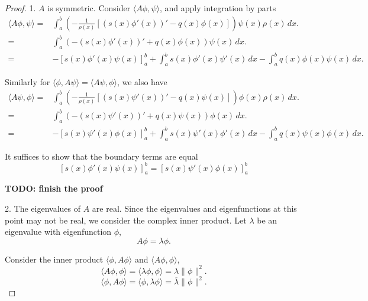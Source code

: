 \begin{proof}
    1. $A$ is symmetric. Consider $\langle A\phi, \psi \rangle$, and apply integration by parts
    \begin{equation}\label{eq.proof_SL_integral_parts}
    \begin{split}
        \langle A\phi, \psi \rangle =& \int_a^b \left(-\frac{1}{\rho(x)}[(s(x)\phi'(x))' - q(x)\phi(x)]\right) \psi(x) \rho(x) \, dx. 
        \\
        =& \int_a^b \left( -(s(x)\phi'(x))' + q(x)\phi(x) \right)\psi(x) \, dx. 
        \\
        =&-[s(x)\phi'(x)\psi(x)]_a^b + \int_a^b s(x)\phi'(x)\psi'(x) \, dx - \int_a^b q(x)\phi(x)\psi(x) \, dx.
    \end{split} 
    \end{equation}

    Similarly for $\langle \phi, A\psi\rangle = \langle A\psi, \phi\rangle$, we also have
    \begin{equation}\label{eq.proof_SL_integral_parts'}
    \begin{split}
        \langle A\psi, \phi\rangle =& \int_a^b \left(-\frac{1}{\rho(x)}[(s(x)\psi'(x))' - q(x)\psi(x)]\right) \phi(x) \rho(x) \, dx. 
        \\
        =& \int_a^b \left( -(s(x)\psi'(x))' + q(x)\psi(x) \right)\phi(x) \, dx. 
        \\
        =&-[s(x)\psi'(x)\phi(x)]_a^b + \int_a^b s(x)\psi'(x)\phi'(x) \, dx - \int_a^b q(x)\psi(x)\phi(x) \, dx.
    \end{split} 
    \end{equation}
    
    It suffices to show that the boundary terms are equal
    \begin{equation}\label{eq.proof_SL_boundary}
        [s(x)\phi'(x)\psi(x)]_a^b = [s(x)\psi'(x)\phi(x)]_a^b
    \end{equation}

    \textbf{TODO: finish the proof}
    
    2.  The eigenvalues of $A$ are real. Since the eigenvalues and eigenfunctions at this point may not be real, we consider the complex inner product. Let $\lambda$ be an eigenvalue with eigenfunction $\phi$,
    \begin{equation}
    A\phi = \lambda \phi.
    \end{equation}
    
    Consider the inner product $\langle \phi, A\phi \rangle$ and $\langle A\phi, \phi \rangle$,
    \begin{equation}
    \langle A\phi, \phi \rangle =  \langle \lambda\phi, \phi \rangle = \lambda \|\phi\|^2.
    \end{equation}
    \begin{equation}
        \langle \phi, A\phi \rangle =  \langle \phi, \lambda\phi \rangle = \overline{\lambda} \|\phi\|^2.
    \end{equation}
    

\end{proof}
